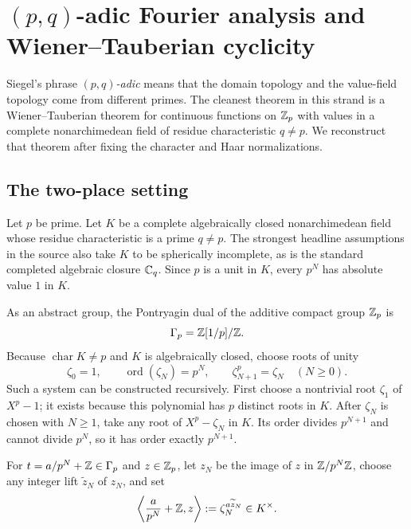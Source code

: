 \section{\texorpdfstring{$(p,q)$-adic}{(p,q)-adic} Fourier analysis and
Wiener--Tauberian cyclicity}
\label{sec:pq-fourier}

Siegel's phrase \emph{$(p,q)$-adic} means that the domain topology and the
value-field topology come from different primes.  The cleanest theorem in
this strand is a Wiener--Tauberian theorem for continuous functions on
$\mathbb Z_p$ with values in a complete nonarchimedean field of residue
characteristic $q\ne p$.  We reconstruct that theorem after fixing the
character and Haar normalizations.

\subsection{The two-place setting}

Let $p$ be prime.  Let $K$ be a complete algebraically closed
nonarchimedean field whose residue characteristic is a prime $q\ne p$.
The strongest headline assumptions in the source also take $K$ to be
spherically incomplete, as is the standard completed algebraic closure
$\mathbb C_q$.  Since $p$ is a unit in $K$, every $p^N$ has absolute value $1$ in
$K$.

As an abstract group, the Pontryagin dual of the additive compact group
$\mathbb Z_p$ is
\begin{equation}
\label{eq:dual-Zp}
 \Gamma_p=\mathbb Z[1/p]/\mathbb Z.
\end{equation}
Because $\operatorname{char}K\ne p$ and $K$ is algebraically closed, choose
roots of unity
\begin{equation}
\label{eq:compatible-p-power-roots}
 \zeta_0=1,
 \qquad \operatorname{ord}(\zeta_N)=p^N,
 \qquad \zeta_{N+1}^{p}=\zeta_N
 \quad(N\geq0).
\end{equation}
Such a system can be constructed recursively.  First choose a nontrivial
root $\zeta_1$ of $X^p-1$; it exists because this polynomial has $p$
distinct roots in $K$.  After $\zeta_N$ is chosen with $N\geq1$, take any
root of $X^p-\zeta_N$ in $K$.  Its order divides $p^{N+1}$ and cannot divide
$p^N$, so it has order exactly $p^{N+1}$.

For $t=a/p^N+\mathbb Z\in\Gamma_p$ and $z\in\mathbb Z_p$, let $z_N$ be the image of $z$
in $\mathbb Z/p^N\mathbb Z$, choose any integer lift $\widetilde z_N$ of $z_N$, and set
\begin{equation}
\label{eq:K-valued-character-pairing}
 \left\langle \frac{a}{p^N}+\mathbb Z,z\right\rangle
 :=\zeta_N^{a\widetilde z_N}\in K^\times.
\end{equation}

